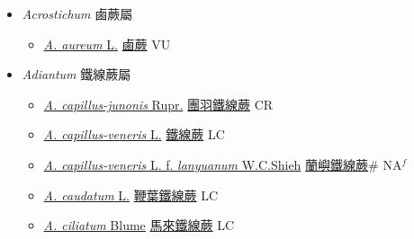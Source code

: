 
  \begin{itemize}
 \item[] \textit{Acrostichum} 鹵蕨屬
                    
  \begin{itemize}
        \item[] \href{http://www.theplantlist.org/tpl1.1/search?q=Acrostichum+aureum}{\textit{A. aureum} L.}   \href{\detokenize{http://taibnet.sinica.edu.tw/chi/taibnet_species_list.php?T2=鹵蕨&T2_new_value=true&fr=y}}{鹵蕨} VU
  \end{itemize}
 \item[] \textit{Adiantum} 鐵線蕨屬
                    
  \begin{itemize}
        \item[] \href{http://www.theplantlist.org/tpl1.1/search?q=Adiantum+capillus-junonis}{\textit{A. capillus-junonis} Rupr.}   \href{\detokenize{http://taibnet.sinica.edu.tw/chi/taibnet_species_list.php?T2=團羽鐵線蕨&T2_new_value=true&fr=y}}{團羽鐵線蕨} CR
        \item[] \href{http://www.theplantlist.org/tpl1.1/search?q=Adiantum+capillus-veneris}{\textit{A. capillus-veneris} L.}   \href{\detokenize{http://taibnet.sinica.edu.tw/chi/taibnet_species_list.php?T2=鐵線蕨&T2_new_value=true&fr=y}}{鐵線蕨} LC
        \item[] \href{http://www.theplantlist.org/tpl1.1/search?q=Adiantum+capillus-veneris+ f. +lanyuanum}{\textit{A. capillus-veneris} L.  f.  \textit{lanyuanum} W.C.Shieh}   \href{\detokenize{http://taibnet.sinica.edu.tw/chi/taibnet_species_list.php?T2=蘭嶼鐵線蕨&T2_new_value=true&fr=y}}{蘭嶼鐵線蕨}\# NA$^f$
        \item[] \href{http://www.theplantlist.org/tpl1.1/search?q=Adiantum+caudatum}{\textit{A. caudatum} L.}   \href{\detokenize{http://taibnet.sinica.edu.tw/chi/taibnet_species_list.php?T2=鞭葉鐵線蕨&T2_new_value=true&fr=y}}{鞭葉鐵線蕨} LC
        \item[] \href{http://www.theplantlist.org/tpl1.1/search?q=Adiantum+ciliatum}{\textit{A. ciliatum} Blume}     \href{\detokenize{http://taibnet.sinica.edu.tw/chi/taibnet_species_list.php?T2=馬來鐵線蕨&T2_new_value=true&fr=y}}{馬來鐵線蕨} LC

\end{itemize}
\end{itemize}
